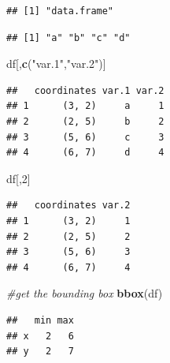 \documentclass[
]{krantz}
\newenvironment{Shaded}{\begin{snugshade}}{\end{snugshade}}
\newcommand{\CommentTok}[1]{\textcolor[rgb]{0.56,0.35,0.01}{\textit{#1}}}
\newcommand{\DecValTok}[1]{\textcolor[rgb]{0.00,0.00,0.81}{#1}}
\newcommand{\FloatTok}[1]{\textcolor[rgb]{0.00,0.00,0.81}{#1}}
\newcommand{\KeywordTok}[1]{\textcolor[rgb]{0.13,0.29,0.53}{\textbf{#1}}}
\newcommand{\NormalTok}[1]{#1}
\newcommand{\OperatorTok}[1]{\textcolor[rgb]{0.81,0.36,0.00}{\textbf{#1}}}
\newcommand{\StringTok}[1]{\textcolor[rgb]{0.31,0.60,0.02}{#1}}
\begin{document}
\begin{verbatim}
## [1] "data.frame"
\end{verbatim}

\begin{Shaded}
\end{Shaded}

\begin{verbatim}
## [1] "a" "b" "c" "d"
\end{verbatim}

\begin{Shaded}
\begin{Highlighting}[]
\NormalTok{df[,}\KeywordTok{c}\NormalTok{(}\StringTok{"var.1"}\NormalTok{,}\StringTok{"var.2"}\NormalTok{)]}
\end{Highlighting}
\end{Shaded}

\begin{verbatim}
##   coordinates var.1 var.2
## 1      (3, 2)     a     1
## 2      (2, 5)     b     2
## 3      (5, 6)     c     3
## 4      (6, 7)     d     4
\end{verbatim}

\begin{Shaded}
\begin{Highlighting}[]
\NormalTok{df[,}\DecValTok{2}\NormalTok{]}
\end{Highlighting}
\end{Shaded}

\begin{verbatim}
##   coordinates var.2
## 1      (3, 2)     1
## 2      (2, 5)     2
## 3      (5, 6)     3
## 4      (6, 7)     4
\end{verbatim}

\begin{Shaded}
\begin{Highlighting}[]
\CommentTok{\#get the bounding box}
\KeywordTok{bbox}\NormalTok{(df)}
\end{Highlighting}
\end{Shaded}

\begin{verbatim}
##   min max
## x   2   6
## y   2   7
\end{verbatim}
\end{document}
